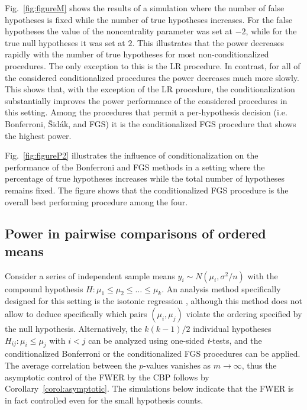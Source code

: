 \documentclass {imsart}
\begin{document}
Fig.~\ref{fig:figureM} shows the results of a simulation where the number of false hypotheses is fixed while the number of true hypotheses increases. For the false hypotheses the value of the noncentrality parameter was set at $-2$, while for the true null hypotheses it was set at $2$. This illustrates that the power decreases rapidly with the number of true hypotheses for most non-conditionalized procedures. The only exception to this is the LR procedure. In contrast, for all of the considered conditionalized procedures the power decreases much more slowly. This shows that, with the exception of the LR procedure, the conditionalization substantially improves the power performance of the considered procedures in this setting. Among the procedures that permit a per-hypothesis decision (i.e. Bonferroni, {\v S}id{\'a}k, and FGS) it is the conditionalized FGS procedure that shows the highest power.

Fig.~\ref{fig:figureP2} illustrates the influence of conditionalization on the performance of the Bonferroni and FGS methods in a setting where the percentage of true hypotheses increases while the total number of hypotheses remains fixed. The figure shows that the conditionalized FGS procedure is the overall best performing procedure among the four.



\subsection{Power in pairwise comparisons of ordered means}
\label{ordered}

Consider a series of independent sample means $y_i \sim N(\mu_i,\sigma^2/n)$ with the compound hypothesis $H:\mu_1 \leq\mu_2\leq\ldots\leq\mu_k$. An analysis method specifically designed for this setting is the isotonic regression \citep{RobertsonWD}, although this method does not allow to deduce specifically which pairs $(\mu_i,\mu_j)$ violate the ordering specified by the null hypothesis. Alternatively, the $k(k-1)/2$ individual hypotheses $H_{ij}:\mu_i\leq\mu_j$ with $i < j$ can be analyzed using one-sided \textit{t}-tests, and the conditionalized Bonferroni or the conditionalized FGS procedures can be applied. The average correlation between the $p$-values vanishes as $m \to \infty$, thus the asymptotic control of the FWER by the CBP follows by Corollary~\ref{corol:asymptotic}. The simulations below indicate that the FWER is in fact controlled even for the small hypothesis counts. 
\end{document}
